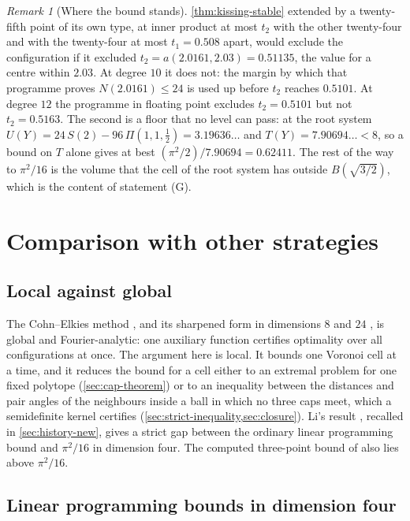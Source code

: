 \documentclass[11pt,reqno]{amsart}
\renewcommand{\_}{\origunderscore\allowbreak}
\numberwithin{equation}{section}
\theoremstyle{plain}
\theoremstyle{definition}
\theoremstyle{remark}
\newtheorem{remark}[thm]{Remark}
\begin{document}
\begin{remark}[Where the bound stands]
{  \cref{thm:kissing-stable} extended by a twenty-fifth point of its own type,
  at inner product at most $t_2$ with the other twenty-four and with the
  twenty-four at most $t_1=0.508$ apart, would exclude the configuration if
  it excluded $t_2=a(2.0161,2.03)=0.51135$, the value for a centre within
  $2.03$. At degree $10$ it does not: the margin by which that programme
  proves $N(2.0161)\le24$ is used up before $t_2$ reaches $0.5101$. At degree
  $12$ the programme in floating point excludes $t_2=0.5101$ but not
  $t_2=0.5163$.} The second is a floor that no
level can pass: at the root system $U(Y)=24\,S(2)-96\,\Pi(1,1,\tfrac12)=3.19636\ldots$
and $T(Y)=7.90694\ldots<8$, so a bound on $T$ alone gives at best
$(\pi^2/2)/7.90694=0.62411$. The rest of the way to $\pi^2/16$ is the volume
that the cell of the root system has outside $B(\sqrt{3/2})$, which is the
content of statement (G).
\end{remark}

\section{Comparison with other strategies}\label{sec:comparison-methods}

\subsection{Local against global}

The Cohn--Elkies method \cite{CE03}, and its sharpened form in dimensions
$8$ and $24$ \cite{Via17,CKM17}, is global and Fourier-analytic: one
auxiliary function certifies optimality over all configurations at once.
The argument here is local. It bounds one Voronoi cell at a time, and it
reduces the bound for a cell either to an extremal problem for one fixed
polytope (\cref{sec:cap-theorem}) or to an inequality between the distances
and pair angles of the neighbours inside a ball in which no three caps meet,
which a semidefinite kernel certifies
(\cref{sec:strict-inequality,sec:closure}). Li's result \cite{Li25}, recalled in \cref{sec:history-new}, gives a
strict gap between the ordinary linear programming bound and
$\pi^2/16$ in dimension four. The computed three-point bound of
\cite{CdLS22} also lies above $\pi^2/16$.

\subsection{Linear programming bounds in dimension four}
\end{document}
